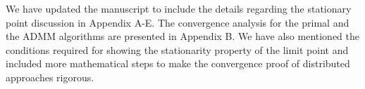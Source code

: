 \begin{enumerate}
\begin{comment}
Note that the objective sequence \eqn{\{f(\mbf{x}_k)\}} generated by an iterative \ac{SCA} algorithm is monotonic, \textit{i.e}, \eqn{f(\mbf{x}_k) \leq f(\mbf{x}_{k-1})} and holds with equality at the limit point of the iterative procedure. However, upon convergence, due to the convexity of the objective, we may have multiple limit points, say, \eqn{\mbf{y}_{\ast}} with the same objective as \eqn{f(\mbf{y}_{\ast}) = f(\mbf{x}_{\ast})}. Therefore, strict monotonicity cannot be guaranteed for the objective sequence. However, when the objective function is strongly convex with a parameter \eqn{m > 0}, as discussed in Appendix A-B, the minimizer for the subproblem in each \ac{SCA} iteration \eqn{k} is unique as
\begin{equation} \label{eqn-aa}
f(\ma_{k}) - f(\ma_{k+1}) \geq  \nabla f(\ma_{k+1})^\tran (\ma_{k} - \ma_{k+1}) + m \|\ma_{k} - \ma_{k+1}\|^2
\end{equation}
where \eqn{\ma_{k+1}} is the optimal solution for the \eqn{\ith{k}} \ac{SCA} subproblem and \eqn{\ma_{k}} is the unique minimizer obtained in the previous \eqn{\ith{k-1}} \ac{SCA} step, which is a feasible point for the current problem. Since \eqn{\ma_{k+1}} is the solution in the \eqn{\ith{k}} \ac{SCA} problem, following conditions hold
\begin{subeqnarray}
\nabla f(\ma_{k+1})^\tran (\ma_{k} - \ma_{k+1}) &\geq& 0 \slabel{eqn-a} \\
f(\ma_{k}) - f(\ma_{k+1}) &\geq& m \|\ma_{k} - \ma_{k+1}\|^2 \slabel{eqn-b}
\end{subeqnarray}
where \eqref{eqn-a} is due to the lack of any descent direction in the feasible set and \eqref{eqn-b} follows from \eqref{eqn-aa} using \eqref{eqn-a}. As \eqn{k \rightarrow \infty, \|\ma_{k+1} - \ma_{k}\| \rightarrow 0}, and therefore the iterative algorithm converges to a unique minimizer, say, \eqn{\ma_{\ast}}, which is the limit point of the algorithm. Now by using the monotonicity of the \ac{SCA} updates and the uniqueness of the minimizer in each step, we can guarantee the strict monotonicity of the objective sequence generated by the iterative problem. 
\end{comment}

 

\resp We have updated the manuscript to include the details regarding the stationary point discussion in Appendix A-E. The convergence analysis for the primal and the \ac{ADMM} algorithms are presented in Appendix B. We have also mentioned the conditions required for showing the stationarity property of the limit point and included more mathematical steps to make the convergence proof of distributed approaches rigorous.

\end{enumerate}
